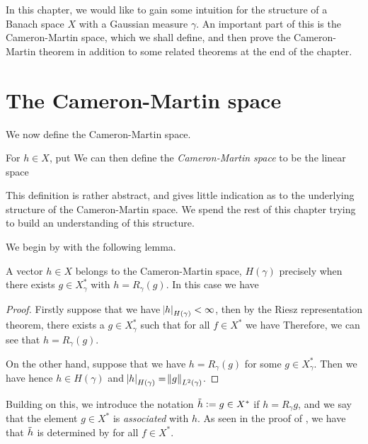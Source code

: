 \documentclass[../main.tex]{subfiles}
\begin{document}
In this chapter, we would like to gain some intuition for the structure of a Banach space $X$ with a Gaussian measure $\gamma$. An important part of this is the Cameron-Martin space, which we shall define, and then prove the Cameron-Martin theorem in addition to some related theorems at the end of the chapter. 

\section{The Cameron-Martin space}

We now define the Cameron-Martin space.
\begin{definition}
For $h\in X$, put  We can then define the \emph{Cameron-Martin space} to be the linear space 
\end{definition}
This definition is rather abstract, and gives little indication as to the underlying structure of the Cameron-Martin space. We spend the rest of this chapter trying to build an understanding of this structure. 

We begin by with the following lemma.
\begin{lemma}
\label{lem:CM1}
A vector $h\in X$ belongs to the Cameron-Martin space, $H(\gamma)$ precisely when there exists $g\in X_\gamma^*$ with $h = R_\gamma(g)$. In this case we have 
\end{lemma}
\begin{proof}
Firstly suppose that we have $\abs{h}_{H(\gamma)}<\infty$, then by the Riesz representation theorem, there exists a $g\in X_\gamma^*$ such that for all $f\in X^*$ we have  Therefore, we can see that $h = R_\gamma(g)$. 

On the other hand, suppose that we have $h = R_\gamma(g)$ for some $g\in X_\gamma^*$. Then we have  hence $h\in H(\gamma)$ and $\abs{h}_{H(\gamma)} = \norm{g}_{L^2(\gamma)}$.
\end{proof}

Building on this, we introduce the notation $\Tilde{h} := g\in X^*$ if $h = R_\gamma g$, and we say that the element $g\in X^*$ is \emph{associated} with $h$. As seen in the proof of , we have that $\Tilde{h}$ is determined by  for all $f\in X^*$.
\end{document}
